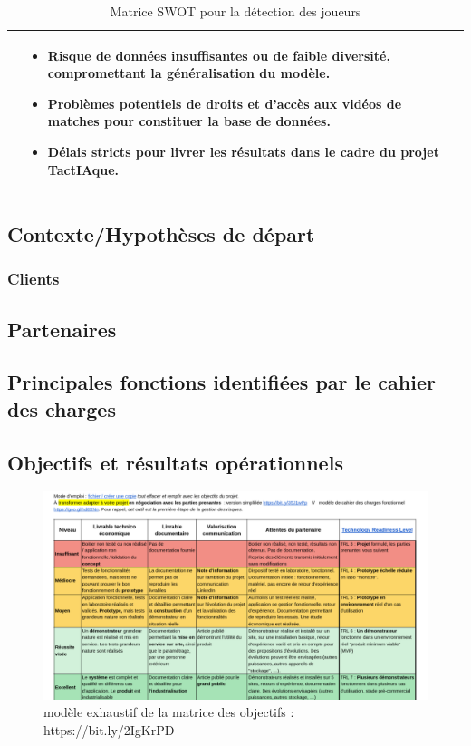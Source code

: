 \begin{table} [!h]
\begin{tabular}{|p{7cm}|p{7cm}|}
\begin{itemize}
        \end{itemize}&
        \begin{itemize}
            \item Risque de données insuffisantes ou de faible diversité, compromettant la généralisation du modèle. 
            \item Problèmes potentiels de droits et d’accès aux vidéos de matches pour constituer la base de données. 
            \item Délais stricts pour livrer les résultats dans le cadre du projet TactIAque. 
        \end{itemize}\\
        \hline  
        \end{tabular}  
        \caption{Matrice SWOT pour la détection des joueurs}  
        \label{tab:swot}
    \end{table} 
\clearpage
\subsection{Contexte/Hypothèses de départ}
\subsubsection{Clients}
\subsection{Partenaires}
\subsection{Principales fonctions identifiées par le cahier des charges}
\subsection{Objectifs et résultats opérationnels}
\begin{figure}[!h]
	\begin{center}
		\includegraphics[scale=0.4]{images/modele_plus_exhaustif_matrice_objectifs.png}
		\caption{modèle exhaustif de la matrice des objectifs : https://bit.ly/2IgKrPD}
	\end{center}
\end{figure}
\clearpage
